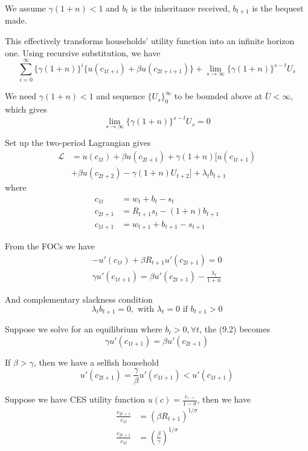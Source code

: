 \documentclass[twocolumn, fleqn]{article}
\begin{document}
			We assume $\gamma(1+n)<1$ and $b_t$ is the inheritance received, $b_{t+1}$ is the bequest made.

			This effectively transforms households' utility function into an infinite horizon one.
			Using recursive substitution, we have
			\[
				\sum_{i=0}^{\infty} \{\gamma(1+n)\}^i \{u(c_{1t+i})+\beta u(c_{2t+i+1})\} +\lim_{s\rightarrow \infty}\{\gamma(1+n)\}^{s-t}U_s
			\]

			We need $\gamma(1+n)<1$ and sequence $\{U_s\}_{0}^{\infty}$ to be bounded above at $\bar{U}<\infty$,
			which gives
			\[
				\lim_{s\rightarrow \infty}\{\gamma(1+n)\}^{s-t}U_s =0
			\]

			Set up the two-period Lagrangian gives
			\begin{align*}
				\mathcal{L} &= u(c_{1t}) + \beta u(c_{2t+1})+ \gamma (1+n)
				[ u(c_{1t+1})\\
				&+ \beta u(c_{2t+2}) - \gamma (1+n) U_{t+2} ] + \lambda_t b_{t+1}
				\end{align*}
			where
			\begin{align*}
				c_{1t} &= w_t + b_t - s_t \\
				c_{2t+1} &= R_{t+1} s_t - (1+n) b_{t+1} \\
				c_{1t+1} &= w_{t+1} + b_{t+1} - s_{t+1}
			\end{align*}

			From the FOCs we have
			\begin{gather*}
				-u'(c_{1t}) + \beta R_{t+1} u'(c_{2t+1}) = 0 \tag{9.1}\\
				\gamma u'(c_{1t+1}) = \beta u'(c_{2t+1})- \frac{\lambda_t}{1+n} \tag{9.2}
			\end{gather*}

			And complementary slackness condition
			\[
				\lambda_t b_{t+1} = 0, \text{ with } \lambda_t =0 \text{ if } b_{t+1}>0
			\]

			Suppose we solve for an equilibrium where $b_t >0, \forall t$, the (9.2) becomes
			\[
				\gamma u'(c_{1t+1}) = \beta u'(c_{2t+1})
			\]

			If $\beta >\gamma$, then we have a selfish household
			\[
				 u'(c_{2t+1}) = \frac{\gamma}{\beta}u'(c_{1t+1}) < u'(c_{1t+1})
			\]

			Suppose we have CES utility function $u(c) = \frac{c_^{1-\sigma}}{1-\sigma}$, then we have
			\begin{align*}
				\frac{c_{2t+1}}{c_{1t}} &= (\beta R_{t+1})^{1/\sigma} \tag{9.3}\\
				\frac{c_{2t+1}}{c_{1t}} &= \left(\frac{\beta}{\gamma}\right)^{1/\sigma} \tag{9.4}
			\end{align*}
\end{document}
